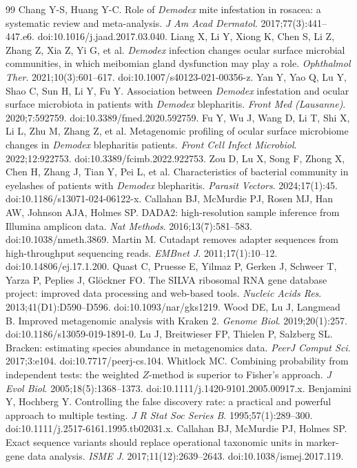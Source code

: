 \documentclass[11pt]{article}
\newcommand{\demodex}{\textit{Demodex}}
\begin{document}
\begin{thebibliography}{99}
 Chang Y-S, Huang Y-C. Role of \demodex{} mite infestation in
  rosacea: a systematic review and meta-analysis. \textit{J Am Acad Dermatol}.
  2017;77(3):441--447.e6. doi:10.1016/j.jaad.2017.03.040.
 Liang X, Li Y, Xiong K, Chen S, Li Z, Zhang Z, Xia Z, Yi G,
  et al. \demodex{} infection changes ocular surface microbial communities, in
  which meibomian gland dysfunction may play a role. \textit{Ophthalmol Ther}.
  2021;10(3):601--617. doi:10.1007/s40123-021-00356-z.
 Yan Y, Yao Q, Lu Y, Shao C, Sun H, Li Y, Fu Y. Association
  between \demodex{} infestation and ocular surface microbiota in patients with
  \demodex{} blepharitis. \textit{Front Med (Lausanne)}. 2020;7:592759.
  doi:10.3389/fmed.2020.592759.
 Fu Y, Wu J, Wang D, Li T, Shi X, Li L, Zhu M, Zhang Z, et al.
  Metagenomic profiling of ocular surface microbiome changes in \demodex{}
  blepharitis patients. \textit{Front Cell Infect Microbiol}. 2022;12:922753.
  doi:10.3389/fcimb.2022.922753.
 Zou D, Lu X, Song F, Zhong X, Chen H, Zhang J, Tian Y, Pei L,
  et al. Characteristics of bacterial community in eyelashes of patients with
  \demodex{} blepharitis. \textit{Parasit Vectors}. 2024;17(1):45.
  doi:10.1186/s13071-024-06122-x.
 Callahan BJ, McMurdie PJ, Rosen MJ, Han AW, Johnson AJA,
  Holmes SP. DADA2: high-resolution sample inference from Illumina amplicon
  data. \textit{Nat Methods}. 2016;13(7):581--583. doi:10.1038/nmeth.3869.
 Martin M. Cutadapt removes adapter sequences from
  high-throughput sequencing reads. \textit{EMBnet J}. 2011;17(1):10--12.
  doi:10.14806/ej.17.1.200.
 Quast C, Pruesse E, Yilmaz P, Gerken J, Schweer T, Yarza P,
  Peplies J, Gl\"ockner FO. The SILVA ribosomal RNA gene database project:
  improved data processing and web-based tools. \textit{Nucleic Acids Res}.
  2013;41(D1):D590--D596. doi:10.1093/nar/gks1219.
 Wood DE, Lu J, Langmead B. Improved metagenomic analysis with
  Kraken 2. \textit{Genome Biol}. 2019;20(1):257. doi:10.1186/s13059-019-1891-0.
 Lu J, Breitwieser FP, Thielen P, Salzberg SL. Bracken:
  estimating species abundance in metagenomics data. \textit{PeerJ Comput Sci}.
  2017;3:e104. doi:10.7717/peerj-cs.104.
 Whitlock MC. Combining probability from independent tests:
  the weighted $Z$-method is superior to Fisher's approach. \textit{J Evol Biol}.
  2005;18(5):1368--1373. doi:10.1111/j.1420-9101.2005.00917.x.
 Benjamini Y, Hochberg Y. Controlling the false discovery rate: a
  practical and powerful approach to multiple testing. \textit{J R Stat Soc
  Series B}. 1995;57(1):289--300. doi:10.1111/j.2517-6161.1995.tb02031.x.
 Callahan BJ, McMurdie PJ, Holmes SP. Exact sequence
  variants should replace operational taxonomic units in marker-gene data
  analysis. \textit{ISME J}. 2017;11(12):2639--2643. doi:10.1038/ismej.2017.119.
\end{thebibliography}
\end{document}
